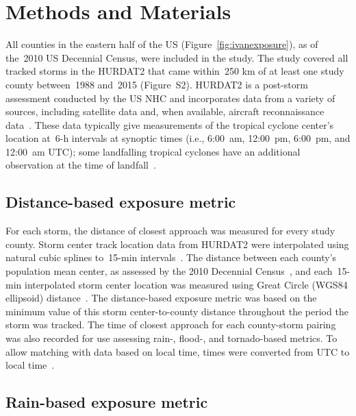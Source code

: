 \section*{Methods and Materials}

All counties in the eastern half of the \ac{US}
(Figure~\ref{fig:ivanexposure}), as of the~2010 \ac{US} Decennial Census, were
included in the study. The study covered all tracked storms in the \ac{HURDAT2}
\citep{landsea2013} that came within~250 \si{\kilo\metre} of at least one study
county between~1988 and~2015 (Figure~S2).  \ac{HURDAT2} is a post-storm
assessment conducted by the \ac{US} \ac{NHC} and incorporates data from a
variety of sources, including satellite data and, when available, aircraft
reconnaissance data~\citep{landsea2013, jarvinen1988}. These data typically
give measurements of the tropical cyclone center's location at~6-\si{\hour} intervals
at synoptic times (i.e., 6:00~am, 12:00~pm, 6:00~pm, and 12:00~am \ac{UTC});
some landfalling tropical cyclones have an additional observation at the time
of landfall~\citep{landsea2013}.

\subsection*{Distance-based exposure metric}

For each storm, the distance of closest approach was measured for every study
county.  Storm center track location data from \ac{HURDAT2} were interpolated
using natural cubic splines to~15-\si{\minute} intervals~\citep{hurricaneexposure}.
The distance between each county's population mean center, as assessed by the
2010 Decennial Census~\citep{countycenters}, and each~15-\si{\minute} interpolated
storm center location was measured using Great Circle (WGS84 ellipsoid)
distance~\citep{bivand2013applied}. The distance-based exposure metric was
based on the minimum value of this storm center-to-county distance throughout
the period the storm was tracked. The time of closest approach for each
county-storm pairing was also recorded for use assessing rain-, flood-, and
tornado-based metrics. To allow matching with data based on local time, times
were converted from \ac{UTC} to local time~\citep{countytimezones}.

\subsection*{Rain-based exposure metric}

